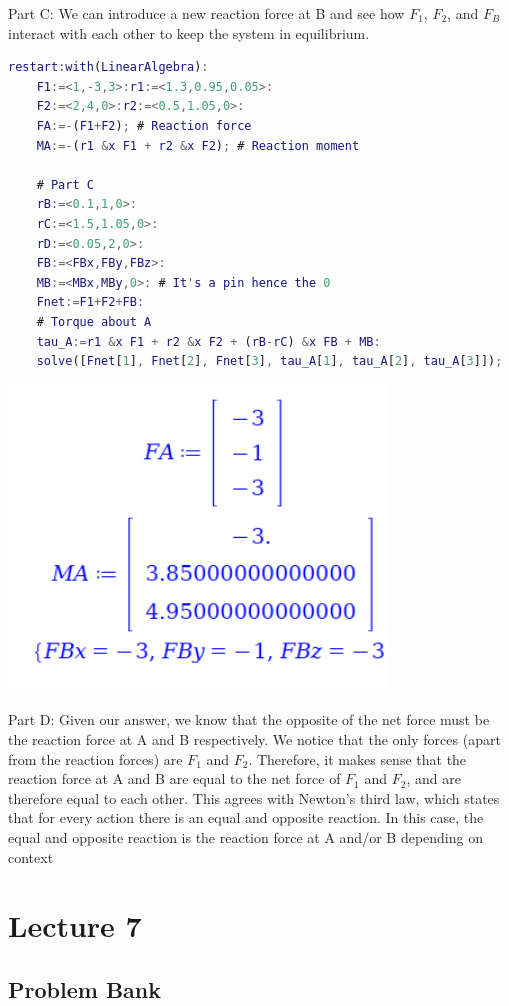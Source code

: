 \documentclass{article}[14pt, letterpaper, Times New Roman]
\begin{document}
Part C: We can introduce a new reaction force at B and see how $F_1$, $F_2$, and $F_B$ interact with each other to keep the system in equilibrium.

\begin{lstlisting}[language=matlab, basicstyle=\small]
	restart:with(LinearAlgebra):
	F1:=<1,-3,3>:r1:=<1.3,0.95,0.05>:
	F2:=<2,4,0>:r2:=<0.5,1.05,0>:
	FA:=-(F1+F2); # Reaction force
	MA:=-(r1 &x F1 + r2 &x F2); # Reaction moment

	# Part C
	rB:=<0.1,1,0>:
	rC:=<1.5,1.05,0>:
	rD:=<0.05,2,0>:
	FB:=<FBx,FBy,FBz>:
	MB:=<MBx,MBy,0>: # It's a pin hence the 0
	Fnet:=F1+F2+FB:
	# Torque about A
	tau_A:=r1 &x F1 + r2 &x F2 + (rB-rC) &x FB + MB:
	solve([Fnet[1], Fnet[2], Fnet[3], tau_A[1], tau_A[2], tau_A[3]]);
\end{lstlisting}

\includegraphics[width=10cm]{l6-pbq-o.png}

Part D: Given our answer, we know that the opposite of the net force must be the reaction force at A and B respectively.
We notice that the only forces (apart from the reaction forces) are $F_1$ and $F_2$. Therefore, it makes sense that the reaction force at A and B are equal to the net force of $F_1$ and $F_2$, and are therefore equal to each other.
This agrees with Newton's third law, which states that for every action there is an equal and opposite reaction.
In this case, the equal and opposite reaction is the reaction force at A and/or B depending on context

\section{Lecture 7}

\subsection{Problem Bank}
\end{document}
